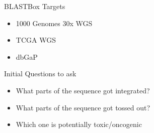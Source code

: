 \documentclass[bigger]{beamer}
\begin{document}
\begin{frame}[label={sec:orgf6af483}]{BLASTBox Targets}
\begin{itemize}
\item 1000 Genomes 30x WGS
\item TCGA WGS
\item dbGaP
\end{itemize}
\end{frame}

\begin{frame}[label={sec:org3fbb729}]{Initial Questions to ask}
\begin{itemize}
\item What parts of the sequence got integrated?
\item What parts of the sequence got tossed out?
\item Which one is potentially toxic/oncogenic
\end{itemize}
\end{frame}
\end{document}
